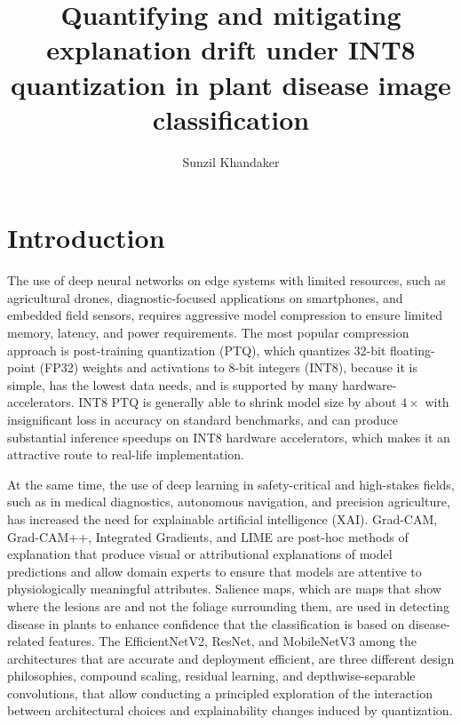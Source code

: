 \documentclass[fleqn,10pt]{wlscirep}
\title{Quantifying and mitigating explanation drift under INT8 quantization in plant disease image classification}
\author[1,*]{Sunzil Khandaker}
\affil[1]{Department of Computer Science and Engineering, Daffodil International University, Dhaka, Bangladesh}
\affil[*]{khandaker15-5383@diu.edu.bd}
\begin{document}
\flushbottom
\maketitle
\thispagestyle{empty}

\section*{Introduction}

The use of deep neural networks on edge systems with limited resources, such as agricultural drones, diagnostic-focused applications on smartphones, and embedded field sensors, requires aggressive model compression to ensure limited memory, latency, and power requirements. The most popular compression approach is post-training quantization (PTQ), which quantizes 32-bit floating-point (FP32) weights and activations to 8-bit integers (INT8), because it is simple, has the lowest data needs, and is supported by many hardware-accelerators\cite{Gholami2021survey,Nagel2021whitepaper,Jacob2018quantization}. INT8 PTQ is generally able to shrink model size by about $4\times$ with insignificant loss in accuracy on standard benchmarks, and can produce substantial inference speedups on INT8 hardware accelerators\cite{Jacob2018quantization}, which makes it an attractive route to real-life implementation.

At the same time, the use of deep learning in safety-critical and high-stakes fields, such as in medical diagnostics, autonomous navigation, and precision agriculture, has increased the need for explainable artificial intelligence (XAI). Grad-CAM\cite{Selvaraju2017gradcam}, Grad-CAM++\cite{Chattopadhay2018gradcampp}, Integrated Gradients\cite{Sundararajan2017ig}, and LIME\cite{Ribeiro2016lime} are post-hoc methods of explanation that produce visual or attributional explanations of model predictions and allow domain experts to ensure that models are attentive to physiologically meaningful attributes. Salience maps, which are maps that show where the lesions are and not the foliage surrounding them, are used in detecting disease in plants to enhance confidence that the classification is based on disease-related features\cite{Nagasubramanian2019plant}. The EfficientNetV2\cite{Tan2021efficientnetv2}, ResNet\cite{He2016resnet}, and MobileNetV3\cite{Howard2019mobilenetv3} among the architectures that are accurate and deployment efficient, are three different design philosophies, compound scaling, residual learning, and depthwise-separable convolutions, that allow conducting a principled exploration of the interaction between architectural choices and explainability changes induced by quantization.
\end{document}
